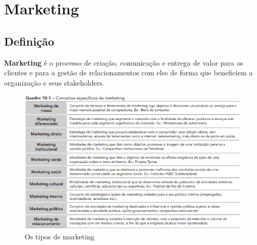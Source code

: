 \documentclass{article}
\begin{document}


\section{Marketing}

\subsection{Definição}
\textbf{Marketing} é o processo de criação, comunicação e entrega de valor para os clientes e para a gestão de relacionamentos com eles de forma que beneficiem a organização e seus stakeholders.

\begin{figure}[H]  %
    \centering
    \begin{minipage}{1.0\textwidth}
        \centering
        \includegraphics[width=\textwidth]{img/imagem10.png}
        \caption{Os tipos de marketing}  %
        \label{fig:exemplo}
    \end{minipage}
\end{figure}
\end{document}
